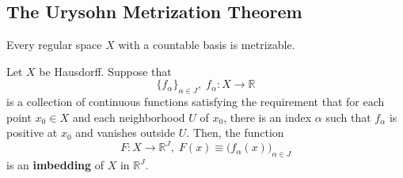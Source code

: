 \subsection{The Urysohn Metrization Theorem}

  \begin{theorem}
    Every regular space $X$ with a countable basis is metrizable. 
  \end{theorem}

  \begin{theorem}
    Let $X$ be Hausdorff. Suppose that 
    \begin{equation}
      \{f_\alpha\}_{\alpha \in J}, \; f_\alpha: X \longrightarrow \mathbb{R}
    \end{equation}
    is a collection of continuous functions satisfying the requirement that for each point $x_0 \in X$ and each neighborhood $U$ of $x_0$, there is an index $\alpha$ such that $f_\alpha$ is positive at $x_0$ and vanishes outside $U$. Then, the function 
    \begin{equation}
      F: X \longrightarrow \mathbb{R}^J, \; F(x) \equiv \big( f_\alpha (x)\big)_{\alpha \in J}
    \end{equation}
    is an \textbf{imbedding} of $X$ in $\mathbb{R}^J$.
  \end{theorem}


